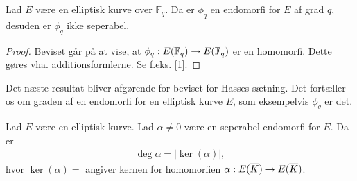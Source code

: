\begin{lemma}
Lad $E$ være en elliptisk kurve over $\mathbb{F}_q$. Da er $\phi_q$ en 
endomorfi for $E$ af grad $q$, desuden er $\phi_q$ ikke seperabel.
\end{lemma}
\begin{proof}
Beviset går på at vise, at $\phi_q : E(\overline{\mathbb{F}}_q) \to E(\overline{\mathbb{F}}_q)$ er en homomorfi. 
Dette gøres vha. additionsformlerne. Se f.eks. [1].
\end{proof}

Det næste resultat bliver afgørende for beviset for Hasses sætning. 
Det fortæller os om graden af en endomorfi for en elliptisk kurve $E$,
som eksempelvis $\phi_q$ er det.

\begin{proposition}
Lad $E$ være en elliptisk kurve. Lad $\alpha \neq 0$ være en seperabel 
endomorfi for $E$. Da er 
\begin{align*}
	\deg \alpha = |\ker (\alpha)|,
\end{align*}
hvor $\ker (\alpha) = $ angiver kernen for homomorfien 
$\alpha : E(\overline{K}) \to E(\overline{K})$.
\end{proposition}
